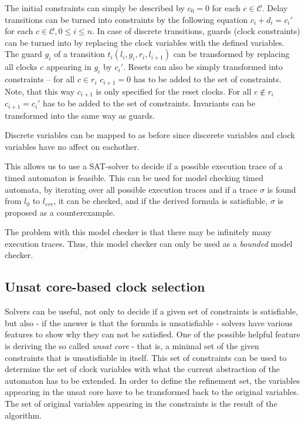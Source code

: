 The initial constraints can simply be described by $c_0 =0$ for each $c \in \mathcal{C}$. Delay transitions can be turned into constraints by the following equation $c_i+d_i=c_i'$ for each $c \in \mathcal{C}, 0 \leq i \leq n$. In case of discrete transitions, guards (clock constraints) can be turned into  by replacing the clock variables with the defined variables. The guard $g_i$ of a transition $t_i(l_i,g_i,r_i,l_{i+1})$ can be transformed by replacing all clocks $c$ appearing in $g_i$ by $c_i'$. Resets can also be simply transformed into constraints -- for all $c \in r_i$ $c_{i+1}=0$ has to be added to the set of constraints. Note, that this way $c_{i+1}$ is only specified for the reset clocks. For all $c \not\in r_i$ $c_{i+1}=c_i'$ has to be added to the set of constraints. Invariants can be transformed into  the same way as guards.

Discrete variables can be mapped to  as before since discerete variables and clock variables have no affect on eachother.


This allows us to use a SAT-solver to decide if a possible execution trace of a timed automaton is feasible. This can be used for model checking timed automata, by iterating over all possible execution traces and if a trace $\sigma$ is found from $l_0$ to $l_{err}$, it can be checked, and if the derived formula is satisfiable, $\sigma$ is proposed as a counterexample. 

The problem with this model checker is that there may be infinitely many execution traces. Thus, this model checker can only be used as a \emph{bounded} model checker.


\subsection{Unsat core-based clock selection}

Solvers can be useful, not only to decide if a given set of constraints is satisfiable, but also - if the answer is that the formula is unsatisfiable - solvers have various features to show why they can not be satisfied. One of the possible helpful feature is deriving the so called \emph{unsat core} - that is, a minimal set of the given constraints that is unsatisfiable in itself. This set of constraints can be used to determine the set of clock variables with what the current abstraction of the automaton has to be extended. In order to define the refinement set, the variables appearing in the unsat core have to be transformed back to the original variables. The set of original variables appearing in the constraints is the result of the algorithm.

